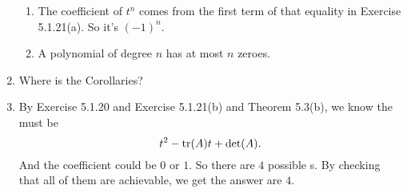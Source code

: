 \begin{enumerate}
\begin{enumerate}
\item The coefficient of $t^n$ comes from the first term of that equality in Exercise 5.1.21(a). So it's $(-1)^n$.
\item A polynomial of degree $n$ has at most $n$ zeroes.
\end{enumerate}
\item Where is the Corollaries?
\item By Exercise 5.1.20 and Exercise 5.1.21(b) and Theorem 5.3(b), we know the \charpoly{} must be 
\[t^2-\operatorname{tr}(A)t+\det(A).\]
And the coefficient could be $0$ or $1$. So there are $4$ possible \charpoly s. By checking that all of them are achievable, we get the answer are $4$.
\end{enumerate}